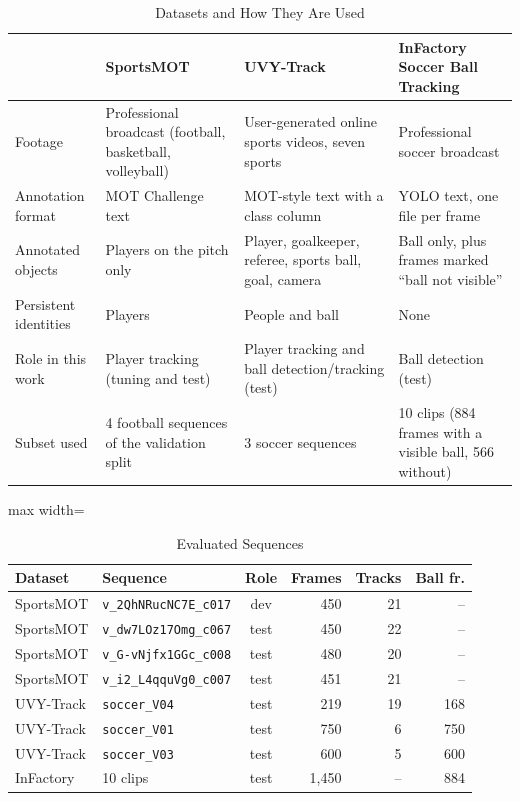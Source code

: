 \documentclass[conference]{IEEEtran}
\begin{document}
\begin{table}[t]
\caption{Datasets and How They Are Used}
\label{tab:datasets}
\centering
\footnotesize
\begin{tabular}{@{}p{2.6cm}p{4.2cm}p{4.9cm}p{4.6cm}@{}}
\toprule
 & SportsMOT~\cite{sportsmot} & UVY-Track~\cite{uvy} & InFactory Soccer Ball Tracking~\cite{infactory} \\
\midrule
Footage & Professional broadcast (football, basketball, volleyball) & User-generated online sports videos, seven sports & Professional soccer broadcast \\
Annotation format & MOT Challenge text & MOT-style text with a class column & YOLO text, one file per frame \\
Annotated objects & Players on the pitch only & Player, goalkeeper, referee, sports ball, goal, camera & Ball only, plus frames marked ``ball not visible'' \\
Persistent identities & Players & People and ball & None \\
Role in this work & Player tracking (tuning and test) & Player tracking and ball detection/tracking (test) & Ball detection (test) \\
Subset used & 4 football sequences of the validation split & 3 soccer sequences & 10 clips (884 frames with a visible ball, 566 without) \\
\bottomrule
\end{tabular}
\end{table}

\begin{table}[t]
\caption{Evaluated Sequences}
\label{tab:sequences}
\centering
\footnotesize
\setlength{\tabcolsep}{3pt}
\begin{adjustbox}{max width=\columnwidth}
\begin{tabular}{@{}llcrrr@{}}
\toprule
Dataset & Sequence & Role & Frames & Tracks & Ball fr. \\
\midrule
SportsMOT & \texttt{v\_2QhNRucNC7E\_c017} & dev & 450 & 21 & -- \\
SportsMOT & \texttt{v\_dw7LOz17Omg\_c067} & test & 450 & 22 & -- \\
SportsMOT & \texttt{v\_G-vNjfx1GGc\_c008} & test & 480 & 20 & -- \\
SportsMOT & \texttt{v\_i2\_L4qquVg0\_c007} & test & 451 & 21 & -- \\
UVY-Track & \texttt{soccer\_V04} & test & 219 & 19 & 168 \\
UVY-Track & \texttt{soccer\_V01} & test & 750 & 6 & 750 \\
UVY-Track & \texttt{soccer\_V03} & test & 600 & 5 & 600 \\
InFactory & 10 clips & test & 1{,}450 & -- & 884 \\
\bottomrule
\end{tabular}
\end{adjustbox}
\end{table}
\end{document}
